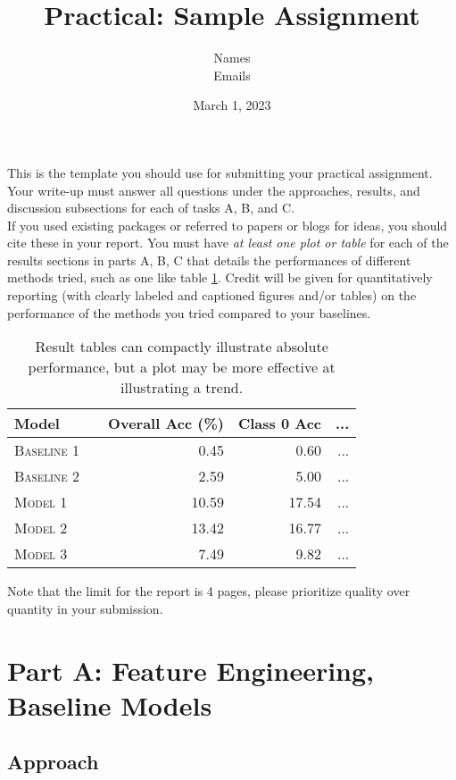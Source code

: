 \documentclass[11pt]{article}
\title{Practical: Sample Assignment}
\author{Names \\ Emails}
\date{March 1, 2023}
\begin{document}
\maketitle{}


\noindent This is the template you should use for submitting your practical assignment. 
Your write-up must
answer all questions under the approaches, results, and discussion subsections
for each of tasks A, B, and C. \\

\noindent If you used existing packages or referred to papers or blogs for ideas,  you should cite these in your report.  You must have \textit{at least one plot or table}
for each of the results sections in parts A, B, C
that details the performances of different methods tried, such as one like table \ref{tab:results}. Credit will be given for quantitatively reporting (with clearly
labeled and captioned figures and/or tables) on the performance of the
methods you tried compared to your baselines.\\

\begin{table}
\centering
\begin{tabular}{llrrr}
 \toprule
 Model &  & Overall Acc (\%) & Class 0 Acc & ... \\
 \midrule
 \textsc{Baseline 1} & & 0.45 & 0.60 & ...\\
 \textsc{Baseline 2} & & 2.59 & 5.00 & ... \\
 \textsc{Model 1} & & 10.59 & 17.54 & ... \\
 \textsc{Model 2} & &13.42 & 16.77 & ... \\
 \textsc{Model 3} & & 7.49 & 9.82 & ... \\
 \bottomrule
\end{tabular}
\caption{\label{tab:results} Result tables can compactly illustrate absolute performance, but a plot may be more effective at illustrating a trend.}
\end{table}


\noindent Note that the limit for the report is 4 pages, please prioritize quality over 
quantity in your submission.\\

\section{Part A: Feature Engineering, Baseline Models}

\subsection{Approach}
\end{document}

